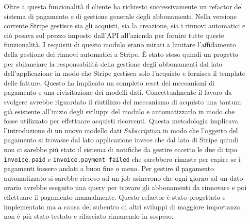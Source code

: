\documentclass[target=bach,aauheader=,style=]{thud}
\begin{document}
Oltre a questa funzionalità il cliente ha richiesto successivamente un refactor del sistema di pagamento e di gestione generale degli abbonamenti. Nella versione corrente Stripe gestisce sia gli
acquisti, sia la creazione, sia i rinnovi automatici e ciò pesava sul prezzo imposto dall'API all'azienda per fornire tutte queste funzionalità. I requisiti di questo modulo erano mirati a limitare
l'affidamento della gestione dei rinnovi automatici a Stripe. È stato steso quindi un progetto per sbilanciare la responsabilità della gestione degli abbonamenti dal lato dell'applicazione in modo che
Stripe gestisca solo l'acquisto e fornisca il template delle fatture. Questo ha implicato un completo reset dei meccanismi di pagamento e una rivisitazione dei modelli dati. Concettualmente il lavoro da svolgere
avrebbe riguardato il riutilizzo del meccanismo di acquisto una tantum già esistente all'inizio degli sviluppi del modulo e automatizzarlo in modo che fosse utilizzato per effettuare acquisti ricorrenti.
Questa metodologia implicava l'introduzione di un nuovo modello dati \textit{Subscription} in modo che l'oggetto del pagamento si trovasse dal lato applicazione invece che dal lato di Stripe quindi non
ci sarebbe più stato il sistema di notifiche da gestire eccetto le due di tipo \texttt{invoice.paid} e \texttt{invoice.payment\_failed} che sarebbero rimaste per capire se i pagamenti fossero andati
a buon fine o meno. Per gestire il pagamento automatizzato si sarebbe ricorso ad un job asincrono che ogni giorno ad un dato orario avrebbe eseguito una query per trovare gli abbonamenti da rinnovare
e poi effettuare il pagamento manualmente. Questo refactor è stato progettato e implementato ma a causa del subentro di altri sviluppi di maggiore importanza non è più stato testato e
rilasciato rimanendo in sospeso.

\backmatter



\end{document}
